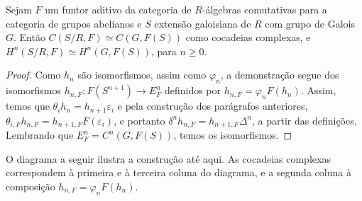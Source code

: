 \begin{teo} \label{teo:isocohomology}
Sejam $F$ um funtor aditivo da categoria de $R$-álgebras comutativas para a categoria de grupos abelianos e $S$ extensão galoisiana de $R$ com grupo de Galois $G$. Então $C(S/R,F) \simeq C(G,F(S))$ como cocadeias complexas, e $H^n(S/R,F)\simeq H^n(G,F(S))$, para $n \geq 0$.
\begin{proof}
Como $h_n$ são isomorfismos, assim como $\varphi_n$, a demonstração segue dos isomorfismos $h_{n, F}: F (S^{n+1}) \rightarrow E_F^n$ definidos por $h_{n,F} = \varphi_n F(h_n)$. Assim, temos que $\theta_i h_n = h_{n+1} \varepsilon_i$ e pela construção dos parágrafos anteriores, $\theta_{i,F} h_{n,F} = h_{n+1, F}F(\varepsilon_i)$, e portanto $\delta^n h_{n,F} = h_{n+1, F} \Delta^n$, a partir das definições. Lembrando que $E^n_F = C^n(G, F(S))$, temos os isomorfismos.
\end{proof}
\end{teo} \par 
O diagrama a seguir ilustra a construção até aqui. As cocadeias complexas correspondem à primeira e à terceira coluna do diagrama, e a segunda coluna à composição $h_{n,F} = \varphi_n F(h_n)$.

\begin{center}
\end{center}

